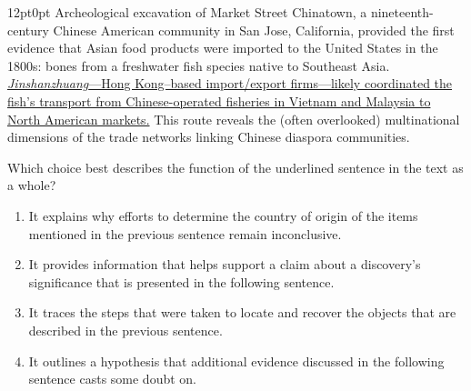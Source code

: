 \documentclass[11pt, twocolumn]{article}
\newcounter{questionnum}
\begin{document}
\vspace{6pt}\noindent
\begin{minipage}{\columnwidth}\raggedright
\noindent{}\par\vspace{8pt}
\begin{adjustwidth}{12pt}{0pt}
Archeological excavation of Market Street Chinatown, a nineteenth-century Chinese American community in San Jose, California, provided the first evidence that Asian food products were imported to the United States in the 1800s: bones from a freshwater fish species native to Southeast Asia. \uline{\textit{Jinshanzhuang}---Hong Kong--based import/export firms---likely coordinated the fish's transport from Chinese-operated fisheries in Vietnam and Malaysia to North American markets.} This route reveals the (often overlooked) multinational dimensions of the trade networks linking Chinese diaspora communities.
\vspace{6pt}

Which choice best describes the function of the underlined sentence in the text as a whole?
\begin{enumerate}[label=\Alph*),leftmargin=18pt,topsep=3pt,itemsep=2pt]
  \item It explains why efforts to determine the country of origin of the items mentioned in the previous sentence remain inconclusive.
  \item It provides information that helps support a claim about a discovery's significance that is presented in the following sentence.
  \item It traces the steps that were taken to locate and recover the objects that are described in the previous sentence.
  \item It outlines a hypothesis that additional evidence discussed in the following sentence casts some doubt on.
\end{enumerate}
\end{adjustwidth}
\end{minipage}\par
\end{document}
